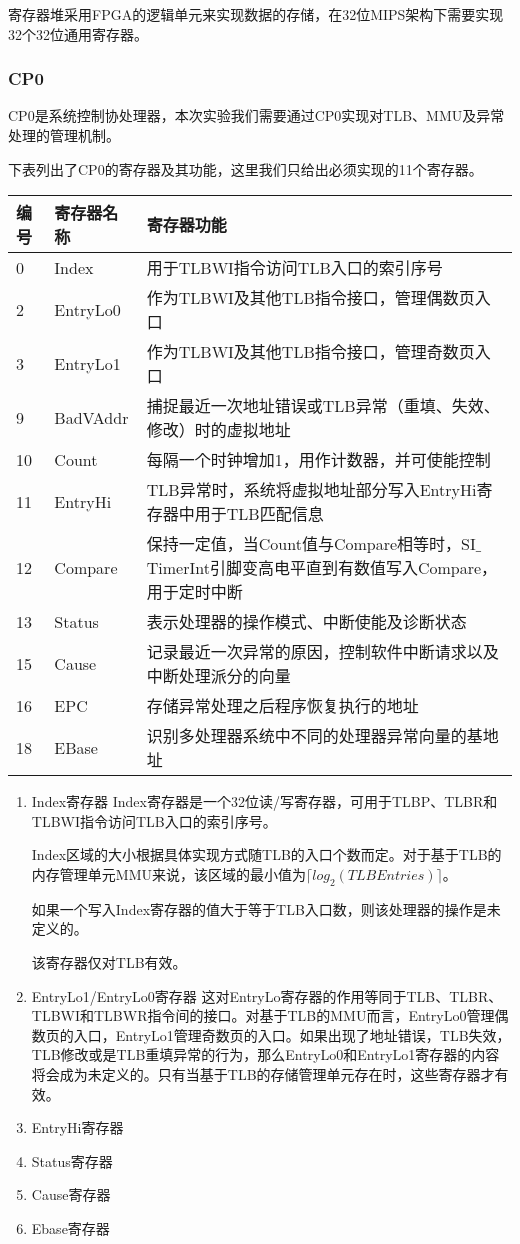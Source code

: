 寄存器堆采用FPGA的逻辑单元来实现数据的存储，在32位MIPS架构下需要实现32个32位通用寄存器。

\subsubsection{CP0}
CP0是系统控制协处理器，本次实验我们需要通过CP0实现对TLB、MMU及异常处理的管理机制。

下表列出了CP0的寄存器及其功能，这里我们只给出必须实现的11个寄存器。

\begin{table}[H]
\centering
\begin{tabular}{lll}
\hline
编号&寄存器名称&寄存器功能\\
\hline
0&Index&用于TLBWI指令访问TLB入口的索引序号\\
2&EntryLo0&作为TLBWI及其他TLB指令接口，管理偶数页入口\\
3&EntryLo1&作为TLBWI及其他TLB指令接口，管理奇数页入口\\
9&BadVAddr&捕捉最近一次地址错误或TLB异常（重填、失效、修改）时的虚拟地址\\
10&Count&每隔一个时钟增加1，用作计数器，并可使能控制\\
11&EntryHi&TLB异常时，系统将虚拟地址部分写入EntryHi寄存器中用于TLB匹配信息\\
12&Compare&保持一定值，当Count值与Compare相等时，SI$\_$TimerInt引脚变高电平直到有数值写入Compare，用于定时中断\\
13&Status&表示处理器的操作模式、中断使能及诊断状态\\
15&Cause&记录最近一次异常的原因，控制软件中断请求以及中断处理派分的向量\\
16&EPC&存储异常处理之后程序恢复执行的地址\\
18&EBase&识别多处理器系统中不同的处理器异常向量的基地址\\
\hline
\end{tabular}
\end{table}

\begin{enumerate}[(1)]
\item Index寄存器
Index寄存器是一个32位读/写寄存器，可用于TLBP、TLBR和TLBWI指令访问TLB入口的索引序号。

Index区域的大小根据具体实现方式随TLB的入口个数而定。对于基于TLB的内存管理单元MMU来说，该区域的最小值为$\lceil log_{2}(TLBEntries)\rceil$。

如果一个写入Index寄存器的值大于等于TLB入口数，则该处理器的操作是未定义的。

该寄存器仅对TLB有效。

\item EntryLo1/EntryLo0寄存器
这对EntryLo寄存器的作用等同于TLB、TLBR、TLBWI和TLBWR指令间的接口。对基于TLB的MMU而言，EntryLo0管理偶数页的入口，EntryLo1管理奇数页的入口。如果出现了地址错误，TLB失效，TLB修改或是TLB重填异常的行为，那么EntryLo0和EntryLo1寄存器的内容将会成为未定义的。只有当基于TLB的存储管理单元存在时，这些寄存器才有效。
\item EntryHi寄存器
\item Status寄存器
\item Cause寄存器
\item Ebase寄存器
\end{enumerate}


